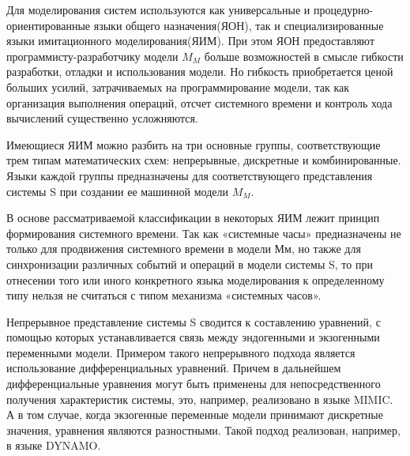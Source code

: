     Для моделирования систем используются как универсальные и процедурно-ориентированные языки общего назначения(ЯОН), так и специализированные языки имитационного моделирования(ЯИМ). При этом ЯОН предоставляют программисту-разработчику модели $M_{M}$ больше возможностей в смысле гибкости разработки, отладки и использования модели. Но гибкость приобретается ценой больших усилий, затрачиваемых на программирование модели, так как организация выполнения операций, отсчет системного времени и контроль хода вычислений существенно усложняются.

    Имеющиеся ЯИМ можно разбить на три основные группы, соответствующие трем типам математических схем: непрерывные, дискретные и комбинированные. Языки каждой группы предназначены для соответствующего представления системы S при создании ее машинной модели $M_{M}$.

    В основе рассматриваемой классификации в некоторых ЯИМ лежит принцип формирования системного времени. Так как «системные часы» предназначены не только для продвижения системного времени в модели Мм, но также для синхронизации различных событий и операций в модели системы S, то при отнесении того или иного конкретного языка моделирования к определенному типу нельзя не считаться с типом механизма «системных часов».

    Непрерывное представление системы S сводится к составлению уравнений, с помощью которых устанавливается связь между эндогенными и экзогенными переменными модели. Примером такого непрерывного подхода является использование дифференциальных уравнений. Причем в дальнейшем дифференциальные уравнения могут быть применены для непосредственного получения характеристик системы, это, например, реализовано в языке MIMIC. А в том случае, когда экзогенные переменные модели принимают дискретные значения, уравнения являются разностными. Такой подход реализован, например, в языке DYNAMO.

